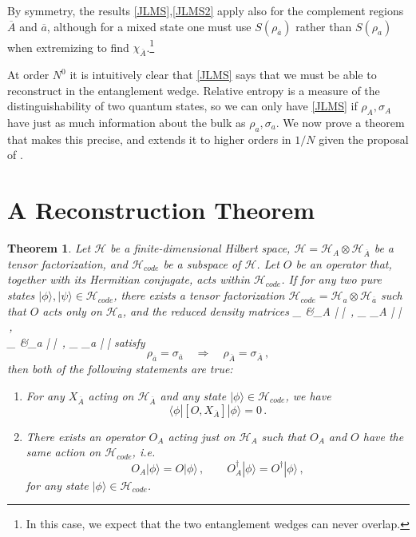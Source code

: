 \documentclass[aps,nofootinbib,longbibliography,superscriptaddress,12pt]{revtex4-1}
\newcommand{\be}{\begin{equation}}
\newcommand{\ee}{\end{equation}}
\newcommand{\Ab}{\overline{A}}
\newcommand{\ab}{\overline{a}}
\newcommand{\HA}{\mathcal{H}_A}
\newcommand{\HAb}{\mathcal{H}_{\overline{A}}}
\newcommand{\Hc}{\mathcal{H}_{code}}
\newcommand{\Ha}{\mathcal{H}_a}
\newcommand{\Hab}{\mathcal{H}_{\overline{a}}}
\newcommand{\mH}{\mathcal{H}}
\newtheorem*{theorem}{Theorem}
\def\ba#1\ea{\begin{align}#1\end{align}}
\def\p{\phi}
\def\r{\rho}
\def\s{\sigma}
\def\y{\psi}
\def\la{\label}
\def\eq{\equiv}
\def\qu{\quad}
\def\qqu{\qquad}
\def\<{\langle}
\def\>{\rangle}
\def\Tr{{\rm Tr}}
\begin{document}
By symmetry, the results \eqref{JLMS},\eqref{JLMS2} apply also for the complement regions $\Ab$ and $\ab$, although for a mixed state one must use $S(\rho_{\ab})$ rather than $S(\rho_{a})$ when extremizing to find $\chi_{\Ab}$.\footnote{In this case, we expect that the two entanglement wedges can never overlap.}

At order $N^0$ it is intuitively clear that \eqref{JLMS} says that we must be able to reconstruct in the entanglement wedge.  Relative entropy is a measure of the distinguishability of two quantum states, so we can only have \eqref{JLMS} if $\rho_A,\sigma_A$ have just as much information about the bulk as $\rho_a,\sigma_a$.  We now prove a theorem that makes this precise, and extends it to higher orders in $1/N$ given the proposal of \cite{Engelhardt:2014gca}.

\section{A Reconstruction Theorem}
\begin{theorem}
Let $\mH$ be a finite-dimensional Hilbert space, $\mH = \HA \otimes \HAb$ be a tensor factorization, and $\Hc$ be a subspace of $\mH$.  Let $O$ be an operator that, together with its Hermitian conjugate, acts within $\Hc$.  If for any two pure states $|\p\>, |\y\> \in \Hc$, there exists a tensor factorization $\Hc = \Ha \otimes \Hab$ such that $O$ acts only on $\Ha$, and the reduced density matrices
\ba\la{rdm}\nonumber
\r_{\Ab} &\eq \Tr_A |\p\> \<\p| \,,\qqu
\s_{\Ab} \eq \Tr_A |\y\> \<\y| \,,\\
\r_{\ab} &\eq \Tr_a |\p\> \<\p| \,,\qqu
\s_{\ab} \eq \Tr_a |\y\> \<\y|
\ea
satisfy
\be\la{cond}
\rho_{\ab}=\sigma_{\ab} \qu\Rightarrow\qu \rho_{\Ab}=\sigma_{\Ab} \,,
\ee
then both of the following statements are true:
\begin{enumerate}
\item For any $X_{\Ab}$ acting on $\HAb$ and any state $|\p\> \in \Hc$, we have
\be\la{zcomm}
\<\p| [O, X_{\Ab}] |\p\> =0 \,.
\ee
\item There exists an operator $O_A$ acting just on $\HA$ such that $O_A$ and $O$ have the same action on $\Hc$, i.e.
\be\la{idact}
O_A |\p\> = O |\p\> \,,\qqu
O_A^\dag |\p\> = O^\dag |\p\> \,,
\ee
for any state $|\p\> \in \Hc$.
\end{enumerate}
\end{theorem}
\end{document}
